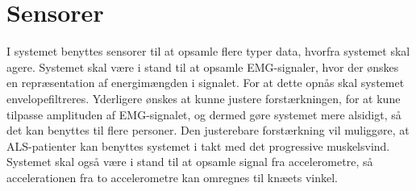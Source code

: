 \section{Sensorer} \label{sec:sensorer}
I systemet benyttes sensorer til at opsamle flere typer data, hvorfra systemet skal agere. Systemet skal være i stand til at opsamle EMG-signaler, hvor der ønskes en repræsentation af energimængden i signalet. For at dette opnås skal systemet envelopefiltreres. Yderligere ønskes at kunne justere forstærkningen, for at kune tilpasse amplituden af EMG-signalet, og dermed gøre systemet mere alsidigt, så det kan benyttes til flere personer. Den justerebare forstærkning vil muliggøre, at ALS-patienter kan benyttes systemet i takt med det progressive muskelsvind.
Systemet skal også være i stand til at opsamle signal fra accelerometre, så accelerationen fra to accelerometre kan omregnes til knæets vinkel. 